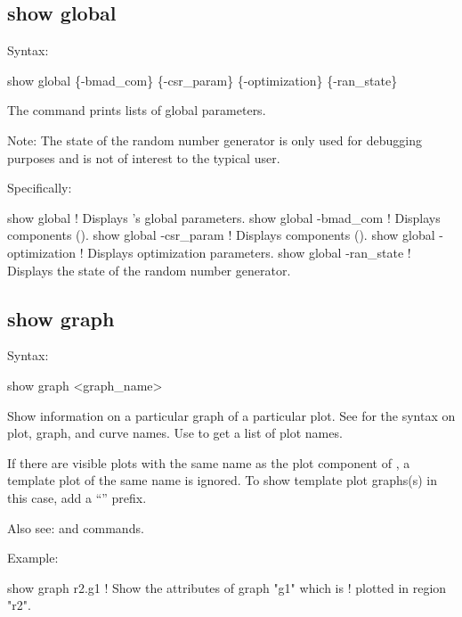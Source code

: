 {{{{{{{{%

\subsection{show global}
\label{s:show.global}

Syntax:
\begin{example}
  show global \{-bmad_com\} \{-csr_param\} \{-optimization\} \{-ran_state\} 
\end{example}

The  command prints lists of global parameters.  

Note: The state of the random number generator is only used for debugging purposes and is not of
interest to the typical user.

Specifically:
\begin{example}
  show global               ! Displays \tao's global parameters.
  show global -bmad_com     ! Displays  components ().
  show global -csr_param    ! Displays  components ().
  show global -optimization ! Displays optimization parameters.
  show global -ran_state    ! Displays the state of the random number generator.
\end{example}


\subsection{show graph}
\label{s:show.graph}

Syntax:
\begin{example}
  show graph <graph_name>
\end{example}

Show information on a particular graph of a particular plot. See  for the syntax on
plot, graph, and curve names.  Use  to get a list of plot names.

If there are visible plots with the same name as the plot component of , a template plot
of the same name is ignored. To show template plot graphs(s) in this case, add a ``''
prefix.

Also see:  and  commands.

Example:
\begin{example}
  show graph r2.g1         ! Show the attributes of graph "g1" which is 
                           !   plotted in region "r2".
\end{example}

}}}}}}}}
